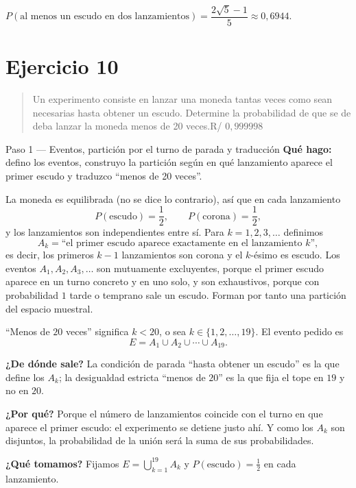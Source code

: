 \documentclass[11pt]{article}
\begin{document}
\begin{resp}
$P(\text{al menos un escudo en dos lanzamientos})=\dfrac{2\sqrt{5}-1}{5}\approx 0{,}6944$.
\end{resp}

\section*{Ejercicio 10}

\begin{quote}
Un experimento consiste en lanzar una moneda tantas veces como sean necesarias hasta obtener un escudo. Determine la probabilidad de que se de deba lanzar la moneda menos de 20 veces.\hfill R/ $0{,}999998$
\end{quote}

\begin{paso}{Paso 1 --- Eventos, partición por el turno de parada y traducción}
\textbf{Qué hago:} defino los eventos, construyo la partición según en qué lanzamiento aparece el primer escudo y traduzco ``menos de 20 veces''.

La moneda es equilibrada (no se dice lo contrario), así que en cada lanzamiento
\[
P(\text{escudo})=\frac{1}{2},
\qquad
P(\text{corona})=\frac{1}{2},
\]
y los lanzamientos son independientes entre sí. Para $k=1,2,3,\dots$ definimos
\[
A_k=\text{``el primer escudo aparece exactamente en el lanzamiento $k$''},
\]
es decir, los primeros $k-1$ lanzamientos son corona y el $k$-ésimo es escudo. Los eventos $A_1,A_2,A_3,\dots$ son mutuamente excluyentes, porque el primer escudo aparece en un turno concreto y en uno solo, y son exhaustivos, porque con probabilidad $1$ tarde o temprano sale un escudo. Forman por tanto una partición del espacio muestral.

``Menos de $20$ veces'' significa $k<20$, o sea $k\in\{1,2,\dots,19\}$. El evento pedido es
\[
E=A_1\cup A_2\cup\cdots\cup A_{19}.
\]

\textbf{¿De dónde sale?} La condición de parada ``hasta obtener un escudo'' es la que define los $A_k$; la desigualdad estricta ``menos de $20$'' es la que fija el tope en $19$ y no en $20$.

\textbf{¿Por qué?} Porque el número de lanzamientos coincide con el turno en que aparece el primer escudo: el experimento se detiene justo ahí. Y como los $A_k$ son disjuntos, la probabilidad de la unión será la suma de sus probabilidades.

\textbf{¿Qué tomamos?} Fijamos $E=\bigcup_{k=1}^{19}A_k$ y $P(\text{escudo})=\tfrac12$ en cada lanzamiento.
\end{paso}
\end{document}
